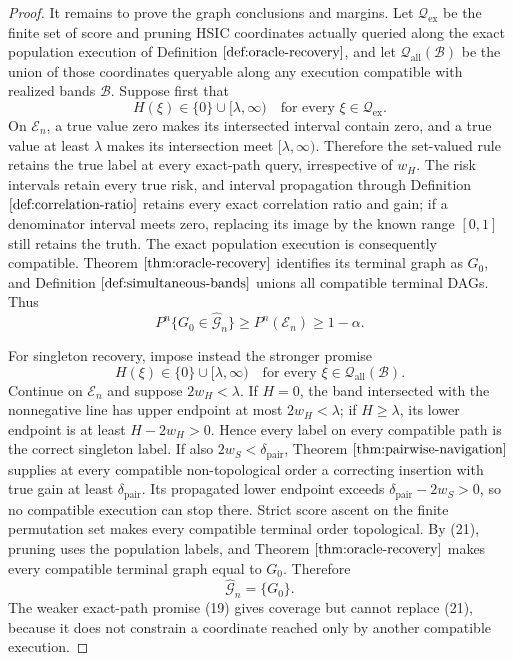 \documentclass{article}
\begin{document}
\begin{proof}
It remains to prove the graph conclusions and margins. Let \(\mathcal Q_{\mathrm{ex}}\) be the finite set of score and pruning HSIC coordinates actually queried along the exact population execution of Definition \(\ref{def:oracle-recovery}\), and let \(\mathcal Q_{\mathrm{all}}(\mathcal B)\) be the union of those coordinates queryable along any execution compatible with realized bands \(\mathcal B\). Suppose first that
\[
 H(\xi)\in\{0\}\cup[\lambda,\infty)
 \quad\text{for every }\xi\in\mathcal Q_{\mathrm{ex}}. \tag{19}
\]
On \(\mathcal E_n\), a true value zero makes its intersected interval contain zero, and a true value at least \(\lambda\) makes its intersection meet \([\lambda,\infty)\). Therefore the set-valued rule retains the true label at every exact-path query, irrespective of \(w_H\). The risk intervals retain every true risk, and interval propagation through Definition \(\ref{def:correlation-ratio}\) retains every exact correlation ratio and gain; if a denominator interval meets zero, replacing its image by the known range \([0,1]\) still retains the truth. The exact population execution is consequently compatible. Theorem \(\ref{thm:oracle-recovery}\) identifies its terminal graph as \(G_0\), and Definition \(\ref{def:simultaneous-bands}\) unions all compatible terminal DAGs. Thus
\[
 P^n\{G_0\in\widehat{\mathcal G}_n\}\ge P^n(\mathcal E_n)\ge1-\alpha. \tag{20}
\]

For singleton recovery, impose instead the stronger promise
\[
 H(\xi)\in\{0\}\cup[\lambda,\infty)
 \quad\text{for every }\xi\in\mathcal Q_{\mathrm{all}}(\mathcal B). \tag{21}
\]
Continue on \(\mathcal E_n\) and suppose \(2w_H<\lambda\). If \(H=0\), the band intersected with the nonnegative line has upper endpoint at most \(2w_H<\lambda\); if \(H\ge\lambda\), its lower endpoint is at least \(H-2w_H>0\). Hence every label on every compatible path is the correct singleton label. If also \(2w_S<\delta_{\mathrm{pair}}\), Theorem \(\ref{thm:pairwise-navigation}\) supplies at every compatible non-topological order a correcting insertion with true gain at least \(\delta_{\mathrm{pair}}\). Its propagated lower endpoint exceeds \(\delta_{\mathrm{pair}}-2w_S>0\), so no compatible execution can stop there. Strict score ascent on the finite permutation set makes every compatible terminal order topological. By (21), pruning uses the population labels, and Theorem \(\ref{thm:oracle-recovery}\) makes every compatible terminal graph equal to \(G_0\). Therefore
\[
 \widehat{\mathcal G}_n=\{G_0\}. \tag{22}
\]
The weaker exact-path promise (19) gives coverage but cannot replace (21), because it does not constrain a coordinate reached only by another compatible execution.


\end{proof}
\end{document}
